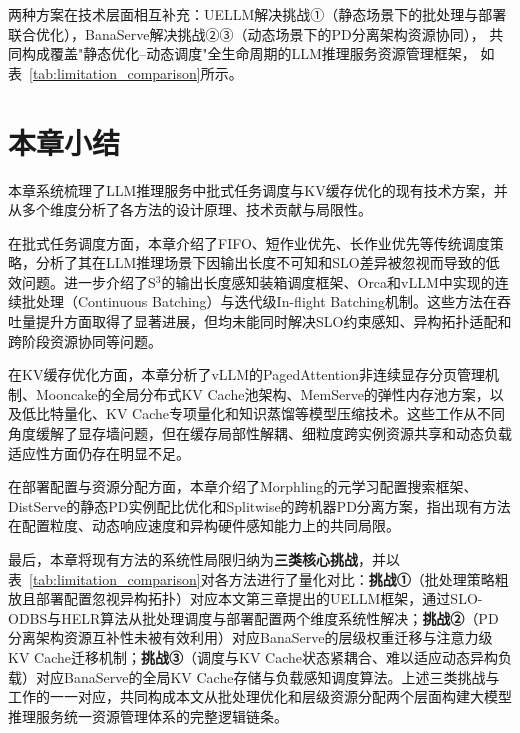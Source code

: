 两种方案在技术层面相互补充：UELLM解决挑战①（静态场景下的批处理与部署
联合优化），BanaServe解决挑战②③（动态场景下的PD分离架构资源协同），
共同构成覆盖"静态优化--动态调度"全生命周期的LLM推理服务资源管理框架，
如表~\ref{tab:limitation_comparison}所示。

\section{本章小结}

本章系统梳理了LLM推理服务中批式任务调度与KV缓存优化的现有技术方案，并从多个维度分析了各方法的设计原理、技术贡献与局限性。

在批式任务调度方面，本章介绍了FIFO、短作业优先、长作业优先等传统调度策略，分析了其在LLM推理场景下因输出长度不可知和SLO差异被忽视而导致的低效问题。进一步介绍了S$^3$的输出长度感知装箱调度框架、Orca和vLLM中实现的连续批处理（Continuous Batching）与迭代级In-flight Batching机制。这些方法在吞吐量提升方面取得了显著进展，但均未能同时解决SLO约束感知、异构拓扑适配和跨阶段资源协同等问题。

在KV缓存优化方面，本章分析了vLLM的PagedAttention非连续显存分页管理机制、Mooncake的全局分布式KV Cache池架构、MemServe的弹性内存池方案，以及低比特量化、KV Cache专项量化和知识蒸馏等模型压缩技术。这些工作从不同角度缓解了显存墙问题，但在缓存局部性解耦、细粒度跨实例资源共享和动态负载适应性方面仍存在明显不足。

在部署配置与资源分配方面，本章介绍了Morphling的元学习配置搜索框架、DistServe的静态PD实例配比优化和Splitwise的跨机器PD分离方案，指出现有方法在配置粒度、动态响应速度和异构硬件感知能力上的共同局限。

最后，本章将现有方法的系统性局限归纳为\textbf{三类核心挑战}，并以表~\ref{tab:limitation_comparison}对各方法进行了量化对比：\textbf{挑战①}（批处理策略粗放且部署配置忽视异构拓扑）对应本文第三章提出的UELLM框架，通过SLO-ODBS与HELR算法从批处理调度与部署配置两个维度系统性解决；\textbf{挑战②}（PD分离架构资源互补性未被有效利用）对应BanaServe的层级权重迁移与注意力级KV Cache迁移机制；\textbf{挑战③}（调度与KV Cache状态紧耦合、难以适应动态异构负载）对应BanaServe的全局KV Cache存储与负载感知调度算法。上述三类挑战与工作的一一对应，共同构成本文从批处理优化和层级资源分配两个层面构建大模型推理服务统一资源管理体系的完整逻辑链条。




